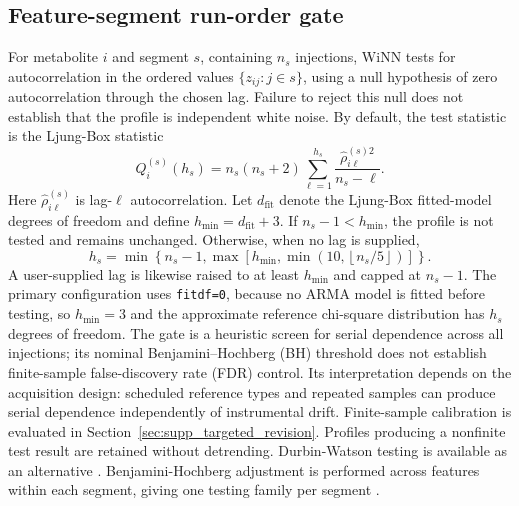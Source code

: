 \documentclass[namedate,webpdf,modern,large,nocrop]{oup-authoring-template}
\begin{document}
\subsection{Feature-segment run-order gate}

For metabolite \(i\) and segment \(s\), containing \(n_s\) injections, WiNN tests for autocorrelation in the ordered values \(\{z_{ij}: j\in s\}\), using a null hypothesis of zero autocorrelation through the chosen lag. Failure to reject this null does not establish that the profile is independent white noise. By default, the test statistic is the Ljung-Box statistic \citep{LjungBox1978}
\[
Q_i^{(s)}(h_s)=n_s(n_s+2)\sum_{\ell=1}^{h_s}\frac{\widehat\rho_{i\ell}^{(s)2}}{n_s-\ell}.
\]
Here \(\widehat\rho_{i\ell}^{(s)}\) is lag-\(\ell\) autocorrelation. Let \(d_{\mathrm{fit}}\) denote the Ljung-Box fitted-model degrees of freedom and define \(h_{\min}=d_{\mathrm{fit}}+3\). If \(n_s-1<h_{\min}\), the profile is not tested and remains unchanged. Otherwise, when no lag is supplied,
\[
h_s=\min\!\left\{n_s-1,\max\!\left[h_{\min},\min\!\left(10,\left\lfloor n_s/5\right\rfloor\right)\right]\right\}.
\]
A user-supplied lag is likewise raised to at least \(h_{\min}\) and capped at \(n_s-1\). The primary configuration uses \texttt{fitdf=0}, because no ARMA model is fitted before testing, so \(h_{\min}=3\) and the approximate reference chi-square distribution has \(h_s\) degrees of freedom. The gate is a heuristic screen for serial dependence across all injections; its nominal Benjamini--Hochberg (BH) threshold does not establish finite-sample false-discovery rate (FDR) control. Its interpretation depends on the acquisition design: scheduled reference types and repeated samples can produce serial dependence independently of instrumental drift. Finite-sample calibration is evaluated in Section~\ref{sec:supp_targeted_revision}. Profiles producing a nonfinite test result are retained without detrending. Durbin-Watson testing is available as an alternative \citep{DurbinWatson1951}. Benjamini-Hochberg adjustment is performed across features within each segment, giving one testing family per segment \citep{BenjaminiHochberg1995}.
\end{document}
